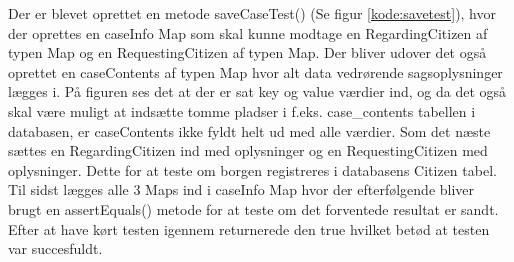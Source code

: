 Der er blevet oprettet en metode saveCaseTest() (Se figur \ref{kode:savetest}), hvor der oprettes en caseInfo Map som skal kunne modtage en RegardingCitizen af typen Map og en RequestingCitizen af typen Map. Der bliver udover det også oprettet en caseContents af typen Map hvor alt data vedrørende sagsoplysninger lægges i. På figuren ses det at der er sat key og value værdier ind, og da det også skal være muligt at indsætte tomme pladser i f.eks. case\_contents tabellen i databasen, er caseContents ikke fyldt helt ud med alle værdier. Som det næste sættes en RegardingCitizen ind med oplysninger og en RequestingCitizen med oplysninger. Dette for at teste om borgen registreres i databasens Citizen tabel. Til sidst lægges alle 3 Maps ind i caseInfo Map hvor der efterfølgende bliver brugt en assertEquals() metode for at teste om det forventede resultat er sandt. \\
Efter at have kørt testen igennem returnerede den true hvilket betød at testen var succesfuldt. \\
